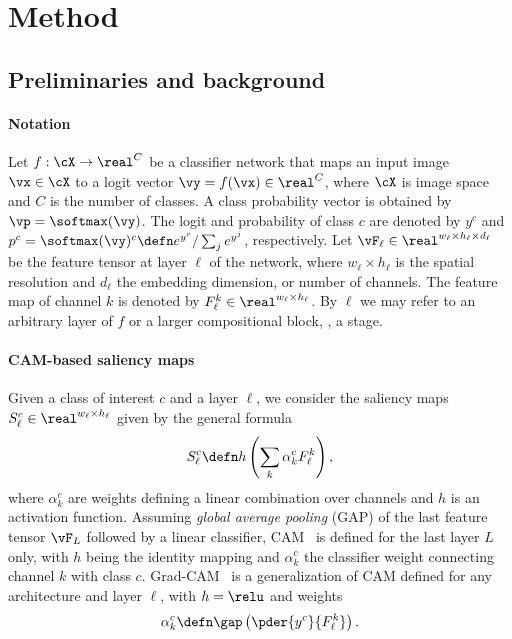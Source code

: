 \section{Method}



\subsection{Preliminaries and background}
\label{subsec:prelim}

\paragraph{Notation}

Let $f: \cX \rightarrow \real^C$ be a classifier network that maps an input image $\vx \in \cX$ to a logit vector $\vy= f(\vx) \in \real^C$, where $\cX$ is image space and $C$ is the number of classes. A class probability vector is obtained by $\vp = \softmax(\vy)$. The logit and probability of class $c$ are denoted by
$y^c$ and $p^c = \softmax(\vy)^c \defn e^{y^c} / \sum_j e^{y^j}$, respectively. Let $\vF_\ell \in \real^{w_\ell \times h_\ell \times d_\ell}$ be the feature tensor at layer $\ell$ of the network, where $w_\ell \times h_\ell$ is the spatial resolution and $d_\ell$ the embedding dimension, or number of channels. The feature map of channel $k$ is denoted by $F^k_\ell \in \real^{w_\ell \times h_\ell}$. By $\ell$ we may refer to an arbitrary layer of $f$ or a larger compositional block, \eg, a stage.

\paragraph{CAM-based saliency maps}

Given a class of interest $c$ and a layer $\ell$, we consider the saliency maps $S^c_\ell \in \real^{w_\ell \times h_\ell}$ given by the general formula
\begin{equation}
	S^c_\ell \defn h \left( \sum_k \alpha^c_k F^k_\ell \right),
\label{eq:sal}
\end{equation}
where $\alpha^c_k$ are weights defining a linear combination over channels and $h$ is an activation function. Assuming \emph{global average pooling} (GAP) of the last feature tensor $\vF_L$ followed by a linear classifier, CAM~\citep{zhou2016learning} is defined for the last layer $L$ only, with $h$ being the identity mapping and $\alpha^c_k$ the classifier weight connecting channel $k$ with class $c$. Grad-CAM~\citep{DBLP:journals/corr/SelvarajuDVCPB16} is a generalization of CAM defined for any architecture and layer $\ell$, with $h = \relu$ and weights
\begin{equation}
	\alpha^c_k \defn \gap \left( \pder{y^c}{F^k_\ell} \right).
\label{eq:gcam}
\end{equation}


